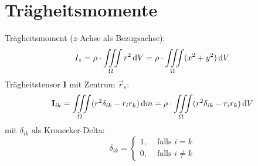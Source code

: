\section{Trägheitsmomente}
Trägheitsmoment ($z$-Achse als Bezugsachse):
\[ I_z = \rho\cdot\iiint\limits_\Omega r^2\,\mathrm{d} V=\rho\cdot\iiint\limits_\Omega (x^2+y^2)\,\mathrm{d} V \]
Trägheitstensor \textbf{I} mit Zentrum $\vec{r}_s$:
\[ \textbf{I}_{ik} = \iiint\limits_\Omega(r^2\delta_{ik}-r_ir_k)\,\mathrm{d} m
	= \rho\cdot\iiint\limits_\Omega(r^2\delta_{ik}-r_ir_k)\,\mathrm{d} V \]
mit $\delta_{ik}$ als Kronecker-Delta:
\[ \delta_{ik} = \left\lbrace \begin{matrix}
	1, & \text{ falls }i=k \\ 0, & \text{ falls }i\neq k \end{matrix} \right. \]
